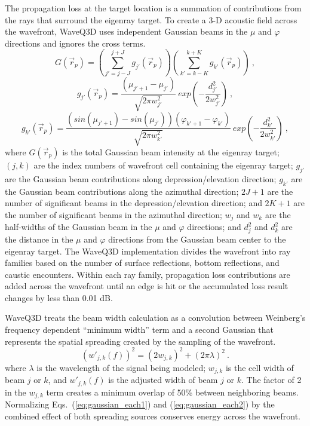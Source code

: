 \documentclass{ws-jca}
\begin{document}
The propagation loss at the target location is a summation of
contributions from the rays that surround the eigenray target. 
To create a 3-D acoustic field across the wavefront, WaveQ3D uses 
independent Gaussian beams in the
\(\mu\) and \(\varphi\) directions and ignores the cross terms. 
\begin{equation}
	G(\vec{r}_p) = \left( \sum_{j'=j-J}^{j+J} g_{j'}(\vec{r}_p)\right) 
		\left( \sum_{k'=k-K}^{k+K} g_{k'}(\vec{r}_p)\right) \:,
	\label{eq:gaussian_sum}
\end{equation}
\begin{equation}
	g_{j'}(\vec{r}_p) = \frac{ \left( \mu_{j'+1} - \mu_{j'} \right) }
		{\sqrt{2\pi w^2_{j'}}} 
		\: exp \left( - \frac{d^2_{j'}}{2w^2_{j'}} \right) \:,
	\label{eq:gaussian_each1}
\end{equation}
\begin{equation}
	g_{k'}(\vec{r}_p) = \frac{ \left( sin(\mu_{j'+1}) - sin(\mu_{j'}) \right) 
		\left( \varphi_{k'+1} - \varphi_{k'} \right) }
		{\sqrt{2\pi w^2_{k'}}} 
		\: exp \left( - \frac{d^2_{k'}}{2w^2_{k'}} \right) \:,
	\label{eq:gaussian_each2}
\end{equation}
where
\(G(\vec{r}_p)\) is the total Gaussian beam intensity at the eigenray target;
$(j,k)$ are the index numbers of wavefront cell containing the eigenray target;
\(g_{j'}\) are the Gaussian beam contributions along depression/elevation direction;
\(g_{k'}\) are the Gaussian beam contributions along the azimuthal direction;
$2J+1$ are the number of significant beams in the depression/elevation direction; and
$2K+1$ are the number of significant beams in the azimuthal direction;
\(w_j\) and \(w_k\) are the half-widths of the Gaussian beam in the \(\mu\)
and \(\varphi\) directions; and
\(d^2_{j}\) and \(d^2_{k}\) are the distance in the \(\mu\) and \(\varphi\)
directions from the Gaussian beam center to the eigenray target. The WaveQ3D
implementation divides the wavefront into ray families based on the number
of surface reflections, bottom reflections, and caustic encounters. Within
each ray family, propagation loss contributions are added across the
wavefront until an edge is hit or the accumulated loss result changes by
less than 0.01 dB.

WaveQ3D treats the beam width calculation as a convolution between Weinberg's
frequency dependent ``minimum width'' term\cite{Weinberg1996} and a second
Gaussian that represents the spatial spreading created by the sampling of
the wavefront.
\begin{equation}
	(w'_{j,k}(f))^2 = \left( 2 w_{j,k} \right)^2 + \left( 2 \pi \lambda \right)^2 \:.
	\label{eq:new_width}
\end{equation}
where
\(\lambda\) is the wavelength of the signal being modeled;
\(w_{j,k}\) is the cell width of beam $j$ or $k$, and
\(w'_{j,k}(f)\) is the adjusted width of beam $j$ or $k$.
The factor of 2 in the \(w_{j,k}\) term creates a minimum overlap of 50\%
between neighboring beams. Normalizing Eqs.~(\ref{eq:gaussian_each1}) and
(\ref{eq:gaussian_each2}) by the combined effect of both spreading sources
conserves energy across the wavefront.
\end{document}
